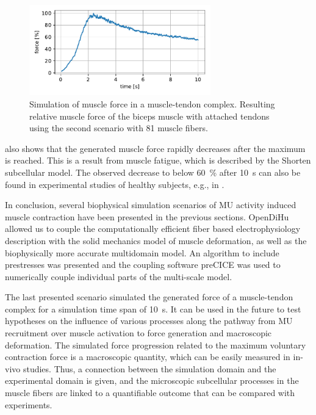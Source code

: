 \begin{figure}
  \centering%
  \includegraphics[width=0.7\textwidth]{images/results/application/precice_muscle_force.pdf}%
  \caption{Simulation of muscle force in a muscle-tendon complex. Resulting relative muscle force of the biceps muscle with attached tendons using the second scenario with 81 muscle fibers.}%
  \label{fig:precice_muscle_force0}%
\end{figure}

 also shows that the generated muscle force rapidly decreases after the maximum is reached. This is a result from muscle fatigue, which is described by the Shorten subcellular model. The observed decrease to below \SI{60}{\percent} after \SI{10}{\s} can also be found in experimental studies of healthy subjects, e.g., in \cite{Enoka2008}. 

In conclusion, several biophysical simulation scenarios of MU activity induced muscle contraction have been presented in the previous sections. OpenDiHu allowed us to couple the computationally efficient fiber based electrophysiology description with the solid mechanics model of muscle deformation, as well as the biophysically more accurate multidomain model. An algorithm to include prestresses was presented and the coupling software preCICE was used to numerically couple individual parts of the multi-scale model. 

The last presented scenario simulated the generated force of a muscle-tendon complex for a simulation time span of \SI{10}{\s}. 
It can be used in the future to test hypotheses on the influence of various processes along the pathway from MU recruitment over muscle activation to force generation and macroscopic deformation. The simulated force progression related to the maximum voluntary contraction force is a macroscopic quantity, which can be easily measured in in-vivo studies. Thus, a connection between the simulation domain and the experimental domain is given, and the microscopic subcellular processes in the muscle fibers are linked to a quantifiable outcome that can be compared with experiments.

